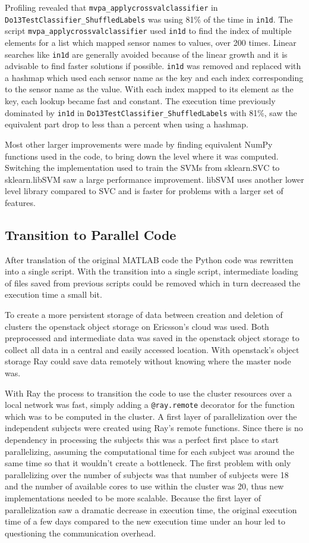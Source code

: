 \documentclass[12pt, a4paper]{article}
\begin{document}
Profiling revealed that \texttt{mvpa\_applycrossvalclassifier} in \\\texttt{Do13TestClassifier\_ShuffledLabels} was using 81\% of the time in \texttt{in1d}.
The script \texttt{mvpa\_applycrossvalclassifier} used \texttt{in1d} to find the index of multiple elements for a list which mapped sensor names to values, over 200 times.
Linear searches like \texttt{in1d} are generally avoided because of the linear growth and it is advisable to find faster solutions if possible.
\texttt{in1d} was removed and replaced with a hashmap which used each sensor name as the key and each index corresponding to the sensor name as the value.
With each index mapped to its element as the key, each lookup became fast and constant.
The execution time previously dominated by \texttt{in1d} in \texttt{Do13TestClassifier\_ShuffledLabels} with 81\%, saw the equivalent part drop to less than a percent when using a hashmap.

Most other larger improvements were made by finding equivalent NumPy functions used in the code, to bring down the level where it was computed.
Switching the implementation used to train the SVMs from sklearn.SVC to sklearn.libSVM saw a large performance improvement.
libSVM uses another lower level library compared to SVC and is faster for problems with a larger set of features.

\subsection{Transition to Parallel Code}
After translation of the original MATLAB code the Python code was
rewritten into a single script.
With the transition into a single script, intermediate loading of files saved from previous scripts could be removed which in turn decreased the execution time a small bit.

To create a more persistent storage of data between creation and deletion of clusters the openstack object storage on Ericsson's cloud was used.
Both preprocessed and intermediate data was saved in the openstack object storage to collect all data in a central and easily accessed location.
With openstack's object storage Ray could save data remotely without knowing where the master node was.

With Ray the process to transition the code to use the cluster resources over a local network was fast, simply adding a \texttt{@ray.remote} decorator for the function which was to be computed in the cluster.
A first layer of parallelization over the independent subjects were created using Ray's remote functions.
Since there is no dependency in processing the subjects this was a perfect first place to start parallelizing, assuming the computational time for each subject was around the same time so that it wouldn't create a bottleneck.
The first problem with only parallelizing over the number of subjects was that number of subjects were 18 and the number of available cores to use within the cluster was 20, thus new implementations needed to be more scalable.
Because the first layer of parallelization saw a dramatic decrease in execution time, the original execution time of a few days compared to the new execution time under an hour led to questioning the communication overhead.
\end{document}
